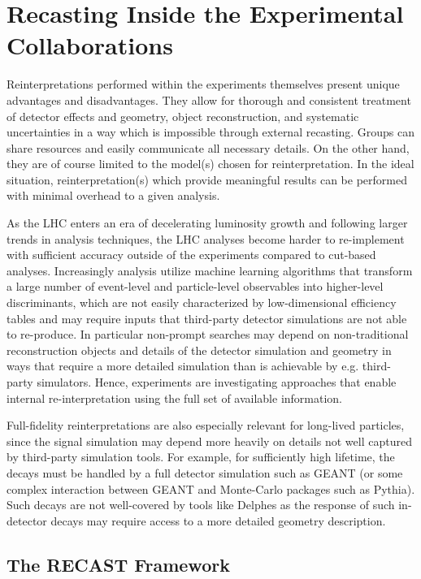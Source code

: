 \section{Recasting Inside the Experimental Collaborations}
\label{sec:ch5-recastingInsideExp}

Reinterpretations performed within the experiments themselves present unique advantages and disadvantages. They allow for thorough and consistent treatment of detector effects and geometry, object reconstruction, and systematic uncertainties in a way which is impossible through external recasting. Groups can share resources and easily communicate all necessary details. On the other hand, they are of course limited to the model(s) chosen for reinterpretation. In the ideal situation, reinterpretation(s) which provide meaningful results can be performed with minimal overhead to a given analysis.

As the LHC enters an era of decelerating luminosity growth and following larger trends in analysis techniques, the LHC analyses become harder to re-implement with sufficient accuracy outside of the experiments compared to cut-based analyses. Increasingly analysis utilize machine learning algorithms that transform a large number of event-level and particle-level observables into higher-level discriminants, which are not easily characterized by low-dimensional efficiency tables and may require inputs that third-party detector simulations are not able to re-produce. In particular non-prompt searches may depend on non-traditional reconstruction objects and details of the detector simulation and geometry in ways that require a more detailed simulation than is achievable by e.g. third-party simulators. Hence, experiments are investigating approaches that enable internal re-interpretation using the full set of available information.

Full-fidelity reinterpretations are also especially relevant for long-lived particles, since the signal simulation may depend more heavily on details not well captured by third-party simulation tools. For example, for sufficiently high lifetime, the decays must be handled by a full detector simulation such as GEANT (or some complex interaction between GEANT and Monte-Carlo packages such as Pythia). Such decays are not well-covered by tools like Delphes as the response of such in-detector decays may require access to a more detailed geometry description.

\subsection{The RECAST Framework}

